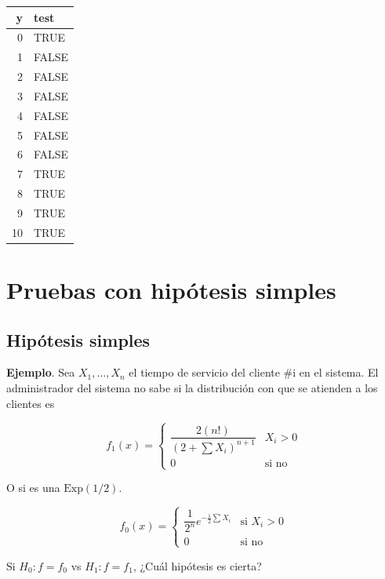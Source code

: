 \documentclass[
  12pt,
]{book}
\begin{document}
\begin{tabular}{r|l}
\hline
y & test\\
\hline
0 & TRUE\\
\hline
1 & FALSE\\
\hline
2 & FALSE\\
\hline
3 & FALSE\\
\hline
4 & FALSE\\
\hline
5 & FALSE\\
\hline
6 & FALSE\\
\hline
7 & TRUE\\
\hline
8 & TRUE\\
\hline
9 & TRUE\\
\hline
10 & TRUE\\
\hline
\end{tabular}

\hypertarget{pruebas-con-hipuxf3tesis-simples}{%
\chapter{Pruebas con hipótesis simples}\label{pruebas-con-hipuxf3tesis-simples}}

\hypertarget{hipuxf3tesis-simples}{%
\section{Hipótesis simples}\label{hipuxf3tesis-simples}}

\textbf{Ejemplo}. Sea \(X_1,\dots, X_n\) el tiempo de servicio del cliente \#i en el sistema.
El administrador del sistema no sabe si la distribución con que se atienden a
los clientes es

\[f_1(x) = \begin{cases}\dfrac{2(n!)}{(2+\sum X_i)^{n+1}} & X_i>0\\0 & \text{si
no}\end{cases}\]

O si es una \(\text{Exp}(1/2)\).

\[f_0(x)=\begin{cases}\dfrac 1{2^n}e^{-\frac12\sum X_i} & \text{si }X_i>0\\0 &
\text{si no} \end{cases}\]

Si \(H_0: f=f_0\) vs \(H_1:f=f_1\), ¿Cuál hipótesis es cierta?
\end{document}

